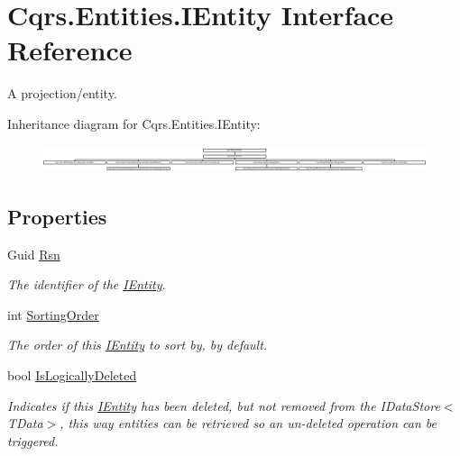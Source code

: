 \hypertarget{interfaceCqrs_1_1Entities_1_1IEntity}{}\section{Cqrs.\+Entities.\+I\+Entity Interface Reference}
\label{interfaceCqrs_1_1Entities_1_1IEntity}


A projection/entity.  


Inheritance diagram for Cqrs.\+Entities.\+I\+Entity\+:\begin{figure}[H]
\begin{center}
\leavevmode
\includegraphics[height=0.801144cm]{interfaceCqrs_1_1Entities_1_1IEntity}
\end{center}
\end{figure}
\subsection*{Properties}
\begin{DoxyCompactItemize}
\item 
Guid \hyperlink{interfaceCqrs_1_1Entities_1_1IEntity_af2bfc288bc574712d7f00af608789f8d_af2bfc288bc574712d7f00af608789f8d}{Rsn}
\begin{DoxyCompactList}\small\item\em The identifier of the \hyperlink{interfaceCqrs_1_1Entities_1_1IEntity}{I\+Entity}. \end{DoxyCompactList}\item 
int \hyperlink{interfaceCqrs_1_1Entities_1_1IEntity_a3de43465f8acc41ff10fd69a8c060225_a3de43465f8acc41ff10fd69a8c060225}{Sorting\+Order}
\begin{DoxyCompactList}\small\item\em The order of this \hyperlink{interfaceCqrs_1_1Entities_1_1IEntity}{I\+Entity} to sort by, by default. \end{DoxyCompactList}\item 
bool \hyperlink{interfaceCqrs_1_1Entities_1_1IEntity_a4c682465a1c45a70380c2ca5e9cab15f_a4c682465a1c45a70380c2ca5e9cab15f}{Is\+Logically\+Deleted}
\begin{DoxyCompactList}\small\item\em Indicates if this \hyperlink{interfaceCqrs_1_1Entities_1_1IEntity}{I\+Entity} has been deleted, but not removed from the I\+Data\+Store$<$\+T\+Data$>$, this way entities can be retrieved so an un-\/deleted operation can be triggered. \end{DoxyCompactList}\end{DoxyCompactItemize}


